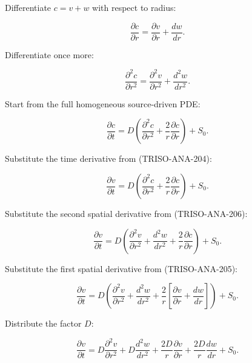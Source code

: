\documentclass[11pt,a4paper]{article}
\begin{document}
Differentiate $c=v+w$ with respect to radius:

\begin{equation}
\frac{\partial c}{\partial r}
=
\frac{\partial v}{\partial r}
+
\frac{dw}{dr}.
\tag{TRISO-ANA-205}
\label{eq:triso-ana-205}
\end{equation}

Differentiate once more:

\begin{equation}
\frac{\partial^2 c}{\partial r^2}
=
\frac{\partial^2v}{\partial r^2}
+
\frac{d^2w}{dr^2}.
\tag{TRISO-ANA-206}
\label{eq:triso-ana-206}
\end{equation}

Start from the full homogeneous source-driven PDE:

\begin{equation}
\frac{\partial c}{\partial t}
=
D
\left(
\frac{\partial^2c}{\partial r^2}
+
\frac2r\frac{\partial c}{\partial r}
\right)
+
S_0.
\tag{TRISO-ANA-207}
\label{eq:triso-ana-207}
\end{equation}

Substitute the time derivative from (TRISO-ANA-204):

\begin{equation}
\frac{\partial v}{\partial t}
=
D
\left(
\frac{\partial^2c}{\partial r^2}
+
\frac2r\frac{\partial c}{\partial r}
\right)
+
S_0.
\tag{TRISO-ANA-208}
\label{eq:triso-ana-208}
\end{equation}

Substitute the second spatial derivative from (TRISO-ANA-206):

\begin{equation}
\frac{\partial v}{\partial t}
=
D
\left(
\frac{\partial^2v}{\partial r^2}
+
\frac{d^2w}{dr^2}
+
\frac2r\frac{\partial c}{\partial r}
\right)
+
S_0.
\tag{TRISO-ANA-209}
\label{eq:triso-ana-209}
\end{equation}

Substitute the first spatial derivative from (TRISO-ANA-205):

\begin{equation}
\frac{\partial v}{\partial t}
=
D
\left(
\frac{\partial^2v}{\partial r^2}
+
\frac{d^2w}{dr^2}
+
\frac2r
\left[
\frac{\partial v}{\partial r}
+
\frac{dw}{dr}
\right]
\right)
+
S_0.
\tag{TRISO-ANA-210}
\label{eq:triso-ana-210}
\end{equation}

Distribute the factor $D$:

\begin{equation}
\frac{\partial v}{\partial t}
=
D\frac{\partial^2v}{\partial r^2}
+
D\frac{d^2w}{dr^2}
+
\frac{2D}{r}\frac{\partial v}{\partial r}
+
\frac{2D}{r}\frac{dw}{dr}
+
S_0.
\tag{TRISO-ANA-211}
\label{eq:triso-ana-211}
\end{equation}
\end{document}

